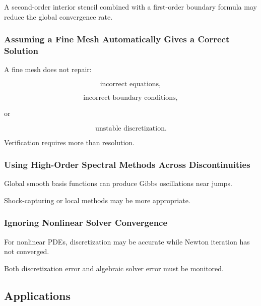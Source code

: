 A second-order interior stencil combined with a first-order boundary
formula may reduce the global convergence rate.

\subsubsection{Assuming a Fine Mesh Automatically Gives a Correct Solution}

A fine mesh does not repair:

\[
\boxed{
\text{incorrect equations},
}
\]

\[
\boxed{
\text{incorrect boundary conditions},
}
\]

or

\[
\boxed{
\text{unstable discretization}.
}
\]

Verification requires more than resolution.

\subsubsection{Using High-Order Spectral Methods Across Discontinuities}

Global smooth basis functions can produce Gibbs oscillations near jumps.

Shock-capturing or local methods may be more appropriate.

\subsubsection{Ignoring Nonlinear Solver Convergence}

For nonlinear PDEs, discretization may be accurate while Newton iteration
has not converged.

Both discretization error and algebraic solver error must be monitored.

\subsection{Applications}
\label{subsec:numerical-pde-applications}

